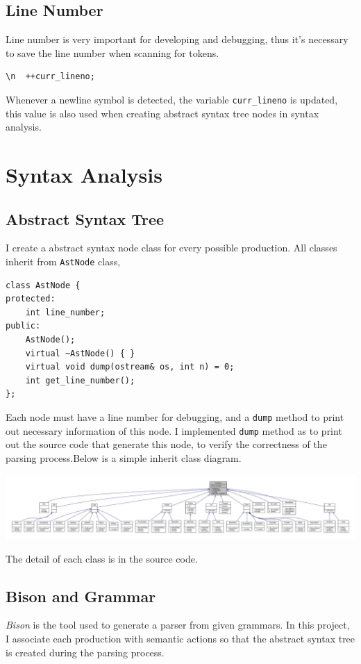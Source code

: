 \documentclass[11pt]{article}
\begin{document}
\subsection{Line Number}
\label{sec:orgheadline4}
Line number is very important for developing and debugging, thus it's necessary
to save the line number when scanning for tokens.
\begin{verbatim}
\n  ++curr_lineno;
\end{verbatim}
Whenever a newline symbol is detected, the variable \texttt{curr\_lineno} is updated,
this value is also used when creating abstract syntax tree nodes in syntax analysis.
\section{Syntax Analysis}
\label{sec:orgheadline8}
\subsection{Abstract Syntax Tree}
\label{sec:orgheadline6}
I create a abstract syntax node class for every possible
production. All classes inherit from \texttt{AstNode} class,
\begin{verbatim}
class AstNode {
protected:
    int line_number;
public:
    AstNode();
    virtual ~AstNode() { }
    virtual void dump(ostream& os, int n) = 0;
    int get_line_number();
};
\end{verbatim}

Each node must have a line number for debugging, and a \texttt{dump} method to print
out necessary information of this node. I implemented \texttt{dump} method as to print
out the source code that generate this node, to verify the correctness of the
parsing process.Below is a simple inherit class diagram.

\includegraphics[width=.9\linewidth]{img/class.pdf}

The detail of each class is in the source code.
\subsection{Bison and Grammar}
\label{sec:orgheadline7}
\emph{Bison} is the tool used to generate a parser from given grammars. In this
project, I associate each production with semantic actions so that the abstract
syntax tree is created during the parsing process.
\end{document}
